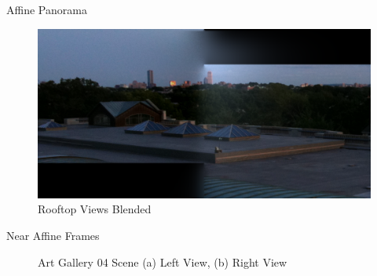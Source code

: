 \documentclass{beamer}
\begin{document}
\begin{frame}[c]{\sc Affine Panorama}

\begin{figure}[!h]
\centering
\includegraphics[width=1\columnwidth]{RooftopSP001001}
\caption{Rooftop Views Blended}
\label{RooftopStitched}
\end{figure}

\end{frame}


\begin{frame}[c]{\sc Near Affine Frames}

\begin{figure}[!h]
\centering
{}
\caption{Art Gallery 04 Scene (a) Left View, (b) Right View}
\label{ArtGallery4Images}
\end{figure}

\end{frame}
\end{document}
